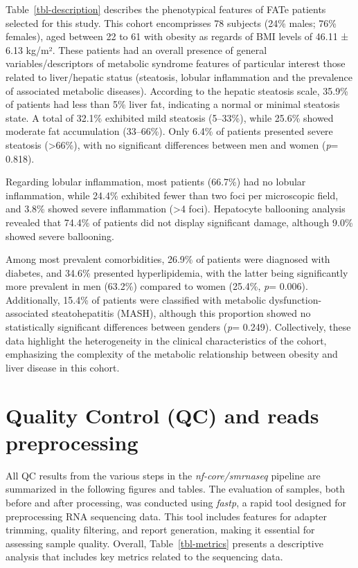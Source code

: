 \documentclass[
  11pt,
  letterpaper,
]{book}
\begin{document}
Table~\ref{tbl-description} describes the phenotypical features of FATe
patients selected for this study. This cohort encomprisses 78 subjects
(24\% males; 76\% females), aged between 22 to 61 with obesity as
regards of BMI levels of 46.11 ± 6.13 kg/m². These patients had an
overall presence of general variables/descriptors of metabolic syndrome
features of particular interest those related to liver/hepatic status
(steatosis, lobular inflammation and the prevalence of associated
metabolic diseases). According to the hepatic steatosis scale, 35.9\% of
patients had less than 5\% liver fat, indicating a normal or minimal
steatosis state. A total of 32.1\% exhibited mild steatosis (5--33\%),
while 25.6\% showed moderate fat accumulation (33--66\%). Only 6.4\% of
patients presented severe steatosis (\textgreater66\%), with no
significant differences between men and women (\emph{p}= 0.818).

Regarding lobular inflammation, most patients (66.7\%) had no lobular
inflammation, while 24.4\% exhibited fewer than two foci per microscopic
field, and 3.8\% showed severe inflammation (\textgreater4 foci).
Hepatocyte ballooning analysis revealed that 74.4\% of patients did not
display significant damage, although 9.0\% showed severe ballooning.

Among most prevalent comorbidities, 26.9\% of patients were diagnosed
with diabetes, and 34.6\% presented hyperlipidemia, with the latter
being significantly more prevalent in men (63.2\%) compared to women
(25.4\%, \emph{p}= 0.006). Additionally, 15.4\% of patients were
classified with metabolic dysfunction-associated steatohepatitis (MASH),
although this proportion showed no statistically significant differences
between genders (\emph{p}= 0.249). Collectively, these data highlight
the heterogeneity in the clinical characteristics of the cohort,
emphasizing the complexity of the metabolic relationship between obesity
and liver disease in this cohort.

\section{Quality Control (QC) and reads
preprocessing}\label{quality-control-qc-and-reads-preprocessing}

All QC results from the various steps in the \emph{nf-core/smrnaseq}
pipeline are summarized in the following figures and tables. The
evaluation of samples, both before and after processing, was conducted
using \emph{fastp}, a rapid tool designed for preprocessing RNA
sequencing data. This tool includes features for adapter trimming,
quality filtering, and report generation, making it essential for
assessing sample quality. Overall, Table~\ref{tbl-metrics} presents a
descriptive analysis that includes key metrics related to the sequencing
data.
\end{document}

